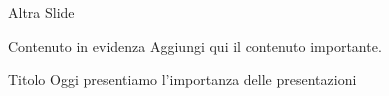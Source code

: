 \documentclass{beamer}
\begin{document}
\begin{frame}{Altra Slide}
    \begin{block}{Contenuto in evidenza}
        Aggiungi qui il contenuto importante.
    \end{block}
\end{frame}

\begin{frame}{Titolo}
    Oggi presentiamo l'importanza delle presentazioni
\end{frame}
\end{document}
